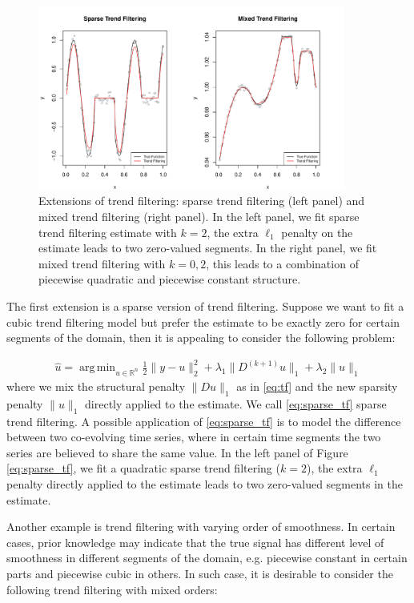 \documentclass[a4paper]{article}
\DeclareMathOperator*{\argmin}{arg\,min}
\newcommand{\RR}{\mathbb{R}}
\begin{document}
\begin{figure}[t!]
\centering
\includegraphics[width = 0.9\textwidth]{Figures/Figure11.pdf}
\caption{Extensions of trend filtering: sparse trend filtering (left panel) and mixed trend filtering (right panel). In the left panel, we fit sparse trend filtering estimate with $k = 2$, the extra $\ell_1$ penalty on the estimate leads to two zero-valued segments. In the right panel, we fit mixed trend filtering with $k=0,2$, this leads to a combination of piecewise quadratic and piecewise constant structure.}
\label{fig:sparse_mixed_tf}
\end{figure}

The first extension is a sparse version of trend filtering. Suppose we want to fit a cubic trend filtering model but prefer the estimate to be exactly zero for certain segments of the domain, then it is appealing to consider the following problem:

\begin{align}
\hat{u} = \argmin_{u\in\RR^n}\frac{1}{2}\|y-u\|_2^2 + \lambda_1\|D^{(k+1)}u\|_1 + \lambda_2\|u\|_1
\label{eq:sparse_tf}
\end{align}
where we mix the structural penalty $\|Du\|_1$ as in \eqref{eq:tf} and the new sparsity penalty $\|u\|_1$ directly applied to the estimate. We call \eqref{eq:sparse_tf} sparse trend filtering. A possible application of \eqref{eq:sparse_tf} is to model the difference between two co-evolving time series, where in certain time segments the two series are believed to share the same value. In the left panel of Figure \ref{eq:sparse_tf}, we fit a quadratic sparse trend filtering ($k=2$), the extra $\ell_1$ penalty directly applied to the estimate leads to two zero-valued segments in the estimate. 

Another example is trend filtering with varying order of smoothness. In certain cases, prior knowledge may indicate that the true signal has different level of smoothness in different segments of the domain, e.g. piecewise constant in certain parts and piecewise cubic in others. In such case, it is desirable to consider the following trend filtering with mixed orders:
\end{document}
